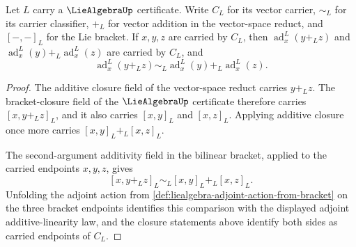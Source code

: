 \begin{theorem}
\label{thm:liealgebra-adjoint-action-additive-linearity}
Let $L$ carry a $\LieAlgebraUp$ certificate. Write $C_L$ for its vector carrier, $\sim_{L}$ for its carrier classifier, $+_{L}$ for vector addition in the vector-space reduct, and $[-,-]_L$ for the Lie bracket. If $x,y,z$ are carried by $C_L$, then $\operatorname{ad}^{L}_{x}(y+_{L}z)$ and $\operatorname{ad}^{L}_{x}(y)+_{L}\operatorname{ad}^{L}_{x}(z)$ are carried by $C_L$, and
$$
\operatorname{ad}^{L}_{x}(y+_{L}z)
\sim_{L}
\operatorname{ad}^{L}_{x}(y)+_{L}\operatorname{ad}^{L}_{x}(z).
$$
\end{theorem}
\begin{proof}
The additive closure field of the vector-space reduct carries $y+_{L}z$. The bracket-closure field of the $\LieAlgebraUp$ certificate therefore carries $[x,y+_{L}z]_L$, and it also carries $[x,y]_L$ and $[x,z]_L$. Applying additive closure once more carries $[x,y]_L+_{L}[x,z]_L$.

The second-argument additivity field in the bilinear bracket, applied to the carried endpoints $x,y,z$, gives
$$
[x,y+_{L}z]_L
\sim_{L}
[x,y]_L+_{L}[x,z]_L.
$$
Unfolding the adjoint action from \autoref{def:liealgebra-adjoint-action-from-bracket} on the three bracket endpoints identifies this comparison with the displayed adjoint additive-linearity law, and the closure statements above identify both sides as carried endpoints of $C_L$.
\end{proof}

